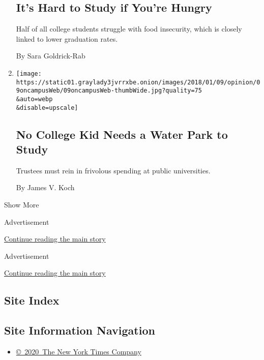 \begin{enumerate}
  \hypertarget{its-hard-to-study-if-youre-hungry}{%
  \subsection{It's Hard to Study if You're
  Hungry}\label{its-hard-to-study-if-youre-hungry}}

  Half of all college students struggle with food insecurity, which is
  closely linked to lower graduation rates.

  By Sara Goldrick-Rab
\item
  \href{/2018/01/09/opinion/trustees-tuition-lazy-rivers.html}{}

  \texttt{[image: https://static01.graylady3jvrrxbe.onion/images/2018/01/09/opinion/09oncampusWeb/09oncampusWeb-thumbWide.jpg?quality=75\\\&auto=webp\\\&disable=upscale]}

  \hypertarget{no-college-kid-needs-a-water-park-to-study}{%
  \subsection{No College Kid Needs a Water Park to
  Study}\label{no-college-kid-needs-a-water-park-to-study}}

  Trustees must rein in frivolous spending at public universities.

  By James V. Koch
\end{enumerate}

Show More

Advertisement

\protect\hyperlink{after-mid2}{Continue reading the main story}

Advertisement

\protect\hyperlink{after-mktg}{Continue reading the main story}

\hypertarget{site-index}{%
\subsection{Site Index}\label{site-index}}

\hypertarget{site-information-navigation}{%
\subsection{Site Information
Navigation}\label{site-information-navigation}}

\begin{itemize}
\tightlist
\item
  \href{https://help.nytimes3xbfgragh.onion/hc/en-us/articles/115014792127-Copyright-notice}{©~2020~The
  New York Times Company}
\end{itemize}

